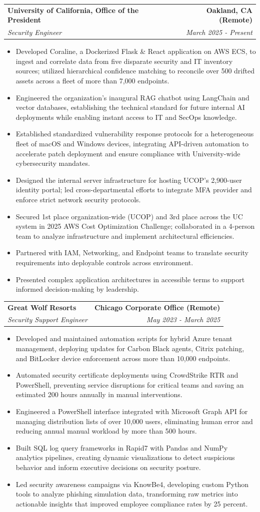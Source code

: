 \documentclass[letterpaper,10pt]{article}
\makeatletter
\newcommand{\resumeItem}[1]{\item{\small #1}}
\newcommand{\resumeItemListStart}{\begin{itemize}}
\newcommand{\resumeItemListEnd}{\end{itemize}\vspace{-2pt}}
\newcommand{\resumeSubheading}[4]{%
  \vspace{-2pt}\item
  \begin{tabular*}{\textwidth}[t]{l@{\extracolsep{\fill}}r}
    \textbf{\large #1} & \textbf{\small #2} \\
    \textit{\large #3} & \textit{\small #4} \\
  \end{tabular*}\vspace{-2pt}
}
\makeatother
\begin{document}
\resumeSubheading
  {University of California, Office of the President}{Oakland, CA (Remote)}
  {Security Engineer}{March 2025 - Present}
  \vspace{4pt}
\resumeItemListStart
  \resumeItem{Developed Coraline, a Dockerized Flask \& React application on AWS ECS, to ingest and correlate data from five disparate security and IT inventory sources; utilized hierarchical confidence matching to reconcile over 500 drifted assets across a fleet of more than 7,000 endpoints.}
  \resumeItem{Engineered the organization's inaugural RAG chatbot using LangChain and vector databases, establishing the technical standard for future internal AI deployments while enabling instant access to IT and SecOps knowledge.}
  \resumeItem{Established standardized vulnerability response protocols for a heterogeneous fleet of macOS and Windows devices, integrating API-driven automation to accelerate patch deployment and ensure compliance with University-wide cybersecurity mandates.}
  \resumeItem{Designed the internal server infrastructure for hosting UCOP's 2,900-user identity portal; led cross-departmental efforts to integrate MFA provider and enforce strict network security protocols.}
  \resumeItem{Secured 1st place organization-wide (UCOP) and 3rd place across the UC system in 2025 AWS Cost Optimization Challenge; collaborated in a 4-person team to analyze infrastructure and implement architectural efficiencies.}  
  \resumeItem{Partnered with IAM, Networking, and Endpoint teams to translate security requirements into deployable controls across environment.}
  \resumeItem{Presented complex application architectures in accessible terms to support informed decision-making by leadership.}
  \resumeItemListEnd
\vspace{6pt}

\resumeSubheading
  {Great Wolf Resorts}{Chicago Corporate Office (Remote)}
  {Security Support Engineer}{May 2023 - March 2025}
\vspace{4pt}
\resumeItemListStart
  \resumeItem{Developed and maintained automation scripts for hybrid Azure tenant management, deploying updates for Carbon Black agents, Citrix patching, and BitLocker device enforcement across more than 10,000 endpoints.}
  \resumeItem{Automated security certificate deployments using CrowdStrike RTR and PowerShell, preventing service disruptions for critical teams and saving an estimated 200 hours annually in manual interventions.}
  \resumeItem{Engineered a PowerShell interface integrated with Microsoft Graph API for managing distribution lists of over 10,000 users, eliminating human error and reducing annual manual workload by more than 500 hours.}
  \resumeItem{Built SQL log query frameworks in Rapid7 with Pandas and NumPy analytics pipelines, creating dynamic visualizations to detect suspicious behavior and inform executive decisions on security posture.}
  \resumeItem{Led security awareness campaigns via KnowBe4, developing custom Python tools to analyze phishing simulation data, transforming raw metrics into actionable insights that improved employee compliance rates by 25 percent.}
\resumeItemListEnd
\vspace{6pt}
\end{document}
